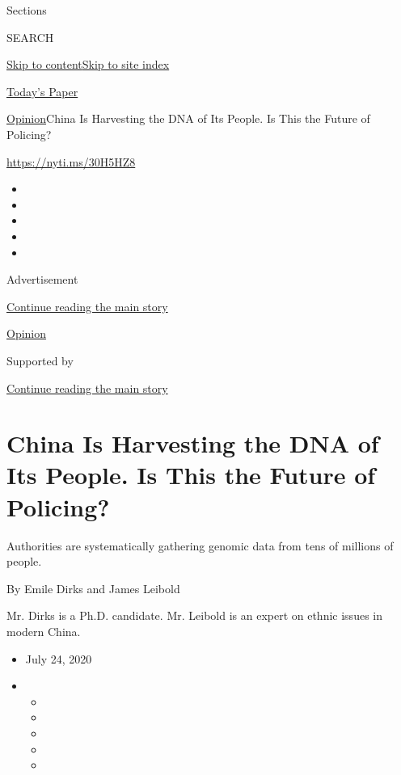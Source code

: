 Sections

SEARCH

\protect\hyperlink{site-content}{Skip to
content}\protect\hyperlink{site-index}{Skip to site index}

\href{https://myaccount.nytimes3xbfgragh.onion/auth/login?response_type=cookie\&client_id=vi}{}

\href{https://www.nytimes3xbfgragh.onion/section/todayspaper}{Today's
Paper}

\href{/section/opinion}{Opinion}\textbar{}China Is Harvesting the DNA of
Its People. Is This the Future of Policing?

\url{https://nyti.ms/30H5HZ8}

\begin{itemize}
\item
\item
\item
\item
\item
\end{itemize}

Advertisement

\protect\hyperlink{after-top}{Continue reading the main story}

\href{/section/opinion}{Opinion}

Supported by

\protect\hyperlink{after-sponsor}{Continue reading the main story}

\hypertarget{china-is-harvesting-the-dna-of-its-people-is-this-the-future-of-policing}{%
\section{China Is Harvesting the DNA of Its People. Is This the Future
of
Policing?}\label{china-is-harvesting-the-dna-of-its-people-is-this-the-future-of-policing}}

Authorities are systematically gathering genomic data from tens of
millions of people.

By Emile Dirks and James Leibold

Mr. Dirks is a Ph.D. candidate. Mr. Leibold is an expert on ethnic
issues in modern China.

\begin{itemize}
\item
  July 24, 2020
\item
  \begin{itemize}
  \item
  \item
  \item
  \item
  \item
  \end{itemize}
\end{itemize}

